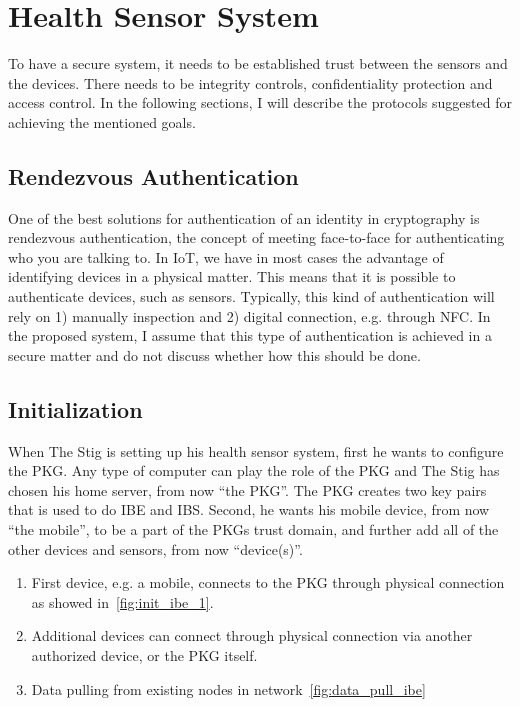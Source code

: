 \section{Health Sensor System}\label{hss}
To have a secure system, it needs to be established trust between the sensors and the devices.
There needs to be integrity controls, confidentiality protection and access control. 
In the following sections, I will describe the protocols suggested for achieving the mentioned goals.

\subsection{Rendezvous Authentication}\label{rendezvous_authentication}
One of the best solutions for authentication of an identity in cryptography is rendezvous authentication, the concept of meeting face-to-face for authenticating who you are talking to. 
In \gls{IoT}, we have in most cases the advantage of identifying devices in a physical matter. 
This means that it is possible to authenticate devices, such as sensors. 
Typically, this kind of authentication will rely on 1) manually inspection and 2) digital connection, e.g. through \gls{NFC}.
In the proposed system, I assume that this type of authentication is achieved in a secure matter and do not discuss whether how this should be done.

\subsection{Initialization}
When The Stig is setting up his health sensor system, first he wants to configure the \gls{PKG}. 
Any type of computer can play the role of the \gls{PKG} and The Stig has chosen his home server, from now ``the PKG''.
The \gls{PKG} creates two key pairs that is used to do \gls{IBE} and \gls{IBS}.
Second, he wants his mobile device, from now ``the mobile'', to be a part of the \gls{PKG}s trust domain, and further add all of the other devices and sensors, from now ``device(s)''.

\begin{enumerate}
  \item First device, e.g. a mobile, connects to the \gls{PKG} through physical connection as showed in~\autoref{fig:init_ibe_1}.
  \item Additional devices can connect through physical connection via another authorized device, or the \gls{PKG} itself. 
  \item Data pulling from existing nodes in network~\autoref{fig:data_pull_ibe}
\end{enumerate}

